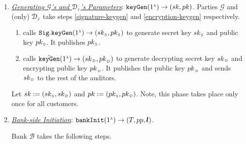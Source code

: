

\begin{enumerate}[leftmargin=.46cm]

\item \underline{\textit{Generating $\mathcal{G}$'s and  $\mathcal{D}_{\scriptscriptstyle j}$'s  Parameters}}:  $\mathtt{keyGen}(1^{\scriptscriptstyle \lambda})\rightarrow (sk,pk)$. Parties $\mathcal{G}$ and (only) $\mathcal{D}_{\scriptscriptstyle j}$   take   steps \ref{signature-keygen} and   \ref{encryption-keygen} respectively. 



\begin{enumerate}
\item\label{signature-keygen} calls $\mathtt{Sig.keyGen}(1^{\scriptscriptstyle \lambda})\rightarrow (sk_{\scriptscriptstyle\mathcal{G}}, pk_{\scriptscriptstyle\mathcal{G}})$ to generate   secret key $sk_{\scriptscriptstyle\mathcal{G}}$ and   public key $pk_{\scriptscriptstyle\mathcal{G}}$. It publishes  $pk_{\scriptscriptstyle\mathcal{G}}$.
%
\item\label{encryption-keygen} calls $\tilde{\mathtt{keyGen}}(1^{\scriptscriptstyle\lambda})\rightarrow({sk}_{\scriptscriptstyle\mathcal {D}}, {pk}_{\scriptscriptstyle\mathcal {D}})$ to generate  decrypting secret key ${sk}_{\scriptscriptstyle\mathcal {D}}$ and encrypting public key ${pk}_{\scriptscriptstyle\mathcal {D}}$. It publishes the public key ${pk}_{\scriptscriptstyle\mathcal {D}}$ and sends ${sk}_{\scriptscriptstyle\mathcal {D}}$ to the rest of the auditors.
\end{enumerate}


Let $sk:=(sk_{\scriptscriptstyle\mathcal{G}}, sk_{\scriptscriptstyle\mathcal{D}})$ and $pk:=(pk_{\scriptscriptstyle\mathcal{G}}, pk_{\scriptscriptstyle\mathcal{D}})$. Note, this   phase takes place only once for all customers.

\item\label{RCPoRP::Bank-side-Initiation}  \underline{\textit{Bank-side Initiation}}: $\mathtt{bankInit}(1^{\scriptscriptstyle \lambda})\rightarrow (T, pp, \bm l)$.

Bank $\mathcal{B}$ takes the following steps. 
\begin{enumerate}


\end{enumerate}
\end{enumerate}
